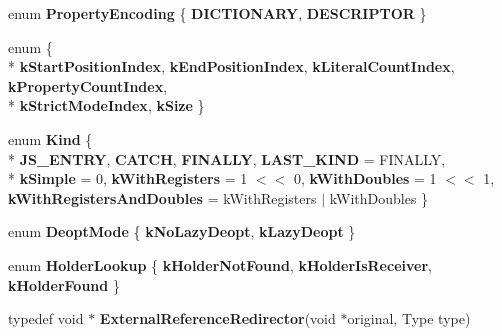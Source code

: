 \begin{DoxyCompactItemize}
\item 
\hypertarget{classv8_1_1internal_1_1_b_a_s_e___e_m_b_e_d_d_e_d_ae7293a56a291983addcee044f0c34a2d}{}enum {\bfseries Property\+Encoding} \{ {\bfseries D\+I\+C\+T\+I\+O\+N\+A\+R\+Y}, 
{\bfseries D\+E\+S\+C\+R\+I\+P\+T\+O\+R}
 \}\label{classv8_1_1internal_1_1_b_a_s_e___e_m_b_e_d_d_e_d_ae7293a56a291983addcee044f0c34a2d}

\item 
\hypertarget{classv8_1_1internal_1_1_b_a_s_e___e_m_b_e_d_d_e_d_abb4fbac19c550e2428ec75bb8b28f5a9}{}enum \{ \\*
{\bfseries k\+Start\+Position\+Index}, 
{\bfseries k\+End\+Position\+Index}, 
{\bfseries k\+Literal\+Count\+Index}, 
{\bfseries k\+Property\+Count\+Index}, 
\\*
{\bfseries k\+Strict\+Mode\+Index}, 
{\bfseries k\+Size}
 \}\label{classv8_1_1internal_1_1_b_a_s_e___e_m_b_e_d_d_e_d_abb4fbac19c550e2428ec75bb8b28f5a9}

\item 
\hypertarget{classv8_1_1internal_1_1_b_a_s_e___e_m_b_e_d_d_e_d_a597b8e57ea3ef503b8b2b9e3a70f42fa}{}enum {\bfseries Kind} \{ \\*
{\bfseries J\+S\+\_\+\+E\+N\+T\+R\+Y}, 
{\bfseries C\+A\+T\+C\+H}, 
{\bfseries F\+I\+N\+A\+L\+L\+Y}, 
{\bfseries L\+A\+S\+T\+\_\+\+K\+I\+N\+D} = F\+I\+N\+A\+L\+L\+Y, 
\\*
{\bfseries k\+Simple} = 0, 
{\bfseries k\+With\+Registers} = 1 $<$$<$ 0, 
{\bfseries k\+With\+Doubles} = 1 $<$$<$ 1, 
{\bfseries k\+With\+Registers\+And\+Doubles} = k\+With\+Registers $\vert$ k\+With\+Doubles
 \}\label{classv8_1_1internal_1_1_b_a_s_e___e_m_b_e_d_d_e_d_a597b8e57ea3ef503b8b2b9e3a70f42fa}

\item 
\hypertarget{classv8_1_1internal_1_1_b_a_s_e___e_m_b_e_d_d_e_d_ae197182bf039524422c58a5eedc95670}{}enum {\bfseries Deopt\+Mode} \{ {\bfseries k\+No\+Lazy\+Deopt}, 
{\bfseries k\+Lazy\+Deopt}
 \}\label{classv8_1_1internal_1_1_b_a_s_e___e_m_b_e_d_d_e_d_ae197182bf039524422c58a5eedc95670}

\item 
\hypertarget{classv8_1_1internal_1_1_b_a_s_e___e_m_b_e_d_d_e_d_a574780580d55298af45d52077d3422fe}{}enum {\bfseries Holder\+Lookup} \{ {\bfseries k\+Holder\+Not\+Found}, 
{\bfseries k\+Holder\+Is\+Receiver}, 
{\bfseries k\+Holder\+Found}
 \}\label{classv8_1_1internal_1_1_b_a_s_e___e_m_b_e_d_d_e_d_a574780580d55298af45d52077d3422fe}

\item 
\hypertarget{classv8_1_1internal_1_1_b_a_s_e___e_m_b_e_d_d_e_d_a3d20e152a0054ebd26b81817ba35280b}{}typedef void $\ast$ {\bfseries External\+Reference\+Redirector}(void $\ast$original, Type type)\label{classv8_1_1internal_1_1_b_a_s_e___e_m_b_e_d_d_e_d_a3d20e152a0054ebd26b81817ba35280b}

\end{DoxyCompactItemize}

